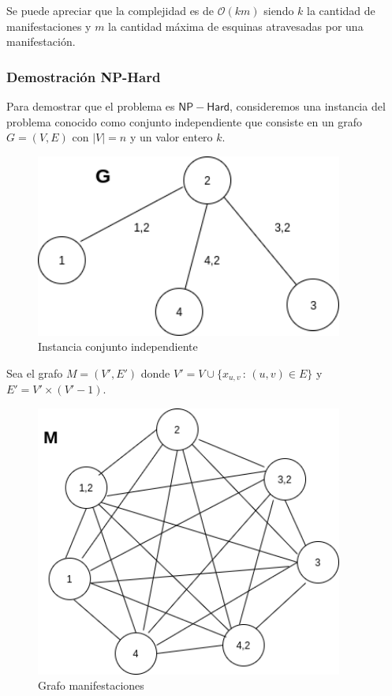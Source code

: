 Se puede apreciar que la complejidad es de $\mathcal{O}(km)$ siendo $k$ la cantidad de manifestaciones y $m$ la cantidad máxima de esquinas atravesadas por una manifestación.

\subsubsection{Demostración NP-Hard}
Para demostrar que el problema es $\mathsf{NP-Hard}$, consideremos una instancia del problema conocido como conjunto independiente que consiste en un grafo $G=(V, E)$ con $|V|=n$ y un valor entero $k$.

\begin{figure}[H]
\centering
\includegraphics[width=0.9\textwidth]{Informe/Imagenes/Parte1/grafico 1.png}
\caption{\label{fig:class01}Instancia conjunto independiente}
\end{figure}

Sea el grafo $M = (V', E')$ donde $V' = V \cup \{ x_{u,v} \, : \, (u,v) \in E \}$ y $E' = V' \times (V'-1)$.

\begin{figure}[H]
\centering
\includegraphics[width=0.9\textwidth]{Informe/Imagenes/Parte1/grafico 2.png}
\caption{\label{fig:class01}Grafo manifestaciones}
\end{figure}

